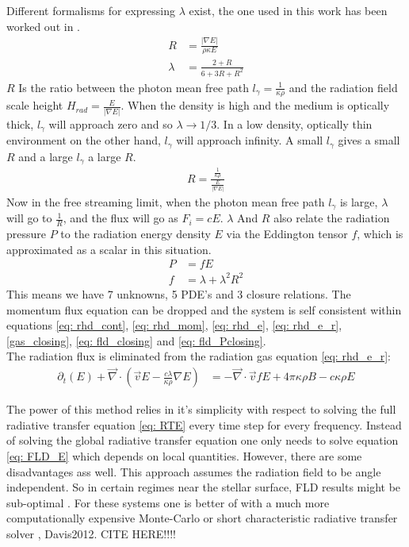 Different formalisms for expressing $\lambda$ exist, the one used in this work has been worked out in \citep{Levermore1981}. 
\begin{align}
R &= \frac{|\nabla E|}{\rho \kappa E} \\
\lambda &= \frac{2 + R}{6 + 3R + R^2} 
\end{align}
$R$ Is the ratio between the photon mean free path $l_\gamma = \frac{1}{\kappa \rho}$ and the radiation field scale height $H_{rad} = \frac{E}{\left| \nabla E \right|}$. When the density is high and the medium is optically thick, $l_\gamma$ will approach zero and so $\lambda \rightarrow 1/3$. In a low density, optically thin environment on the other hand, $l_\gamma$ will approach infinity. A small $l_\gamma$ gives a small $R$ and a large $l_\gamma$ a large $R$.
\begin{align*}
R = \frac{\frac{1}{\kappa \rho}}{\frac{E}{\left| \nabla E \right|}}
\end{align*}
Now in the free streaming limit, when the photon mean free path $l_\gamma$ is large, $\lambda$ will go to $\frac{1}{R}$, and the flux will go as $F_i = cE$. $\lambda$ And $R$ also relate the radiation pressure $P$ to the radiation energy density $E$ via the Eddington tensor $f$, which is approximated as a scalar in this situation.
\begin{align}
P &= f E  \label{eq: fld_Pclosing} \\
f &= \lambda + \lambda^2 R^2
\end{align}
This means we have 7 unknowns, 5 PDE's and 3 closure relations. The momentum flux equation can be dropped and the system is self consistent within equations \eqref{eq: rhd_cont}, \eqref{eq: rhd_mom}, \eqref{eq: rhd_e}, \eqref{eq: rhd_e_r}, \eqref{gas_closing}, \eqref{eq: fld_closing} and \eqref{eq: fld_Pclosing}. \\

The radiation flux is eliminated from the radiation gas equation \ref{eq: rhd_e_r}:
\begin{align}
 \partial_t \left(E \right) +  \vec{\nabla} \cdot \left( \vec{v} E -\frac{c \lambda}{\kappa \rho} \nabla E \right) &=  -\vec{\nabla} \cdot \vec{v} fE + 4\pi \kappa\rho B - c \kappa \rho E \label{eq: FLD_E}
\end{align}

The power of this method relies in it's simplicity with respect to solving the full radiative transfer equation \eqref{eq: RTE} every time step for every frequency. Instead of solving the global radiative transfer equation one only needs to solve equation \eqref{eq: FLD_E} which depends on local quantities. However, there are some disadvantages ass well. This approach assumes the radiation field to be angle independent. So in certain regimes near the stellar surface, FLD results might be sub-optimal \citep{Turner12001}. For these systems one is better of with a much more computationally expensive Monte-Carlo or short characteristic radiative transfer solver \citep{Harries2015}, {Davis2012}. CITE HERE!!!!\\

